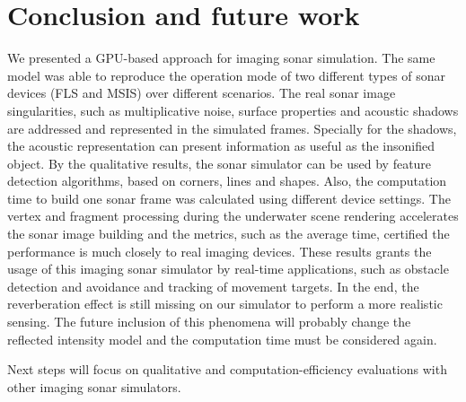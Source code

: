 \documentclass[final,5p,times]{elsarticle}
\begin{document}

\section{Conclusion and future work}
\label{conclusion}

We presented a GPU-based approach for imaging sonar simulation. The same model was able to reproduce the operation mode of two different types of sonar devices (FLS and MSIS) over different scenarios. The real sonar image singularities, such as multiplicative noise, surface properties and acoustic shadows are addressed and represented in the simulated frames. Specially for the shadows, the acoustic representation can present information as useful as the insonified object. By the qualitative results, the sonar simulator can be used by feature detection algorithms, based on corners, lines and shapes. Also, the computation time to build one sonar frame was calculated using different device settings. The vertex and fragment processing during the underwater scene rendering accelerates the sonar image building and the metrics, such as the average time, certified the performance is much closely to real imaging devices. These results grants the usage of this imaging sonar simulator by real-time applications, such as obstacle detection and avoidance and tracking of movement targets. In the end, the reverberation effect is still missing on our simulator to perform a more realistic sensing. The future inclusion of this phenomena will probably change the reflected intensity model and the computation time must be considered again.

Next steps will focus on qualitative and computation\hyp{}efficiency evaluations with other imaging sonar simulators.









\end{document}
